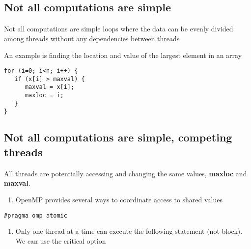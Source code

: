 \subsection*{Not all computations are simple}

\paragraph{}
Not all computations are simple loops where the data can be evenly 
divided among threads without any dependencies between threads

An example is finding the location and value of the largest element in an array







\begin{verbatim}
for (i=0; i<n; i++) { 
   if (x[i] > maxval) {
      maxval = x[i];
      maxloc = i; 
   }
}

\end{verbatim}



\subsection*{Not all computations are simple, competing threads}

\paragraph{}
All threads are potentially accessing and changing the same values, \textbf{maxloc} and \textbf{maxval}.
\begin{enumerate}
\item OpenMP provides several ways to coordinate access to shared values
\end{enumerate}

\noindent


\begin{verbatim}
#pragma omp atomic

\end{verbatim}

\begin{enumerate}
\item Only one thread at a time can execute the following statement (not block). We can use the critical option
\end{enumerate}

